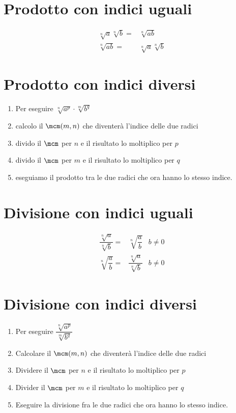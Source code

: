 \section{Prodotto con indici uguali}
\begin{align}
\sqrt[n]{a}\sqrt[n]{b}=&\sqrt[n]{ab}\\
\sqrt[n]{ab}=&\sqrt[n]{a}\sqrt[n]{b}
\end{align}
\section{Prodotto con indici diversi}
\begin{enumerate}
	\item Per eseguire $\sqrt[n]{a^p}\cdot\sqrt[m]{b^q}$
	\item calcolo il $\mcm(m,n)$ che diventerà l'indice  delle due radici
	\item divido il  $\mcm$ per $n$ e il risultato lo moltiplico per $p$
	\item divido il  $\mcm$ per $m$ e il risultato lo moltiplico per $q$
	\item eseguiamo  il prodotto tra le due radici che ora hanno lo stesso indice.
\end{enumerate}
\section{Divisione con indici uguali}
\begin{align}
\dfrac{\sqrt[n]{a}}{\sqrt[n]{b}}=&\sqrt[n]{\dfrac{a}{b}}&b\neq 0\\
\sqrt[n]{\dfrac{a}{b}}=&\dfrac{\sqrt[n]{a}}{\sqrt[n]{b}}&b\neq 0
\end{align}
\section{Divisione con indici diversi}
\begin{enumerate}
	\item Per eseguire
	$\dfrac{\sqrt[n]{a^p}}{\sqrt[m]{b^q}}$
	\item Calcolare il $\mcm(m,n)$ che diventerà l'indice  delle due radici
	\item Dividere il  $\mcm$ per $n$ e il risultato lo moltiplico per $p$
	\item Divider il  $\mcm$ per $m$ e il risultato lo moltiplico per $q$
	\item Eseguire la divisione fra le due radici che ora hanno lo stesso indice.
\end{enumerate}
